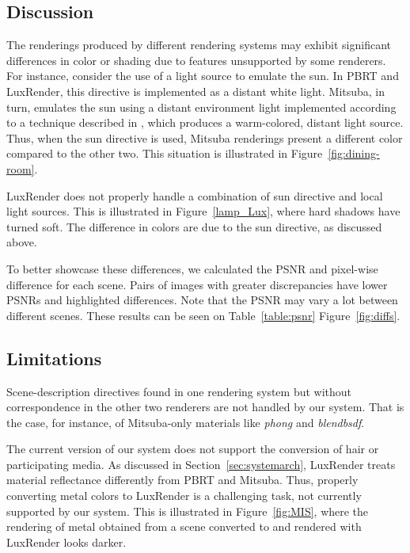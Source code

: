 \subsection{Discussion}
\label{subsec:discussion}

The renderings produced by different rendering systems may exhibit significant differences in color or shading due to features unsupported by some renderers.  
For instance, consider the use of a light source to emulate the sun. In PBRT and LuxRender, this directive is implemented as a distant white light.
Mitsuba, in turn, emulates the sun using a distant environment light implemented according to a technique 
described in \cite{Preetham}, which produces a warm-colored, distant light source. Thus, when the sun directive is used, Mitsuba renderings present a different color compared to the other two. This situation is illustrated in Figure~\ref{fig:dining-room}.

LuxRender does not properly handle a combination of sun directive and local light sources. This is illustrated in Figure~\ref{lamp_Lux}, where hard shadows have turned soft. The difference in colors are due to the sun directive, as discussed above.

To better showcase these differences, we calculated the PSNR and pixel-wise difference for each scene. Pairs of images with greater discrepancies have lower PSNRs and highlighted differences. Note that the PSNR may vary a lot between different scenes. These results can be seen on Table~\ref{table:psnr} Figure~\ref{fig:diffs}.



\subsection{Limitations}
Scene-description directives found in one rendering system but without correspondence in the other two renderers are not handled by our system. That is the case, for instance, of Mitsuba-only materials like \textit{phong} and \textit{blendbsdf}. 

The current version of our system does not support the conversion of hair or participating media. 
%
As discussed in Section~\ref{sec:systemarch}, LuxRender treats material reflectance differently from PBRT and Mitsuba. Thus, properly converting metal colors to LuxRender is a challenging task, not currently supported by our system. This is illustrated in Figure~\ref{fig:MIS}, where the rendering of metal obtained from a scene converted to and rendered with LuxRender looks darker.  

